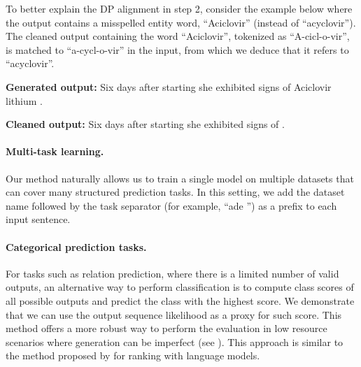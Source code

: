 To better explain the DP alignment in step 2, consider the example below where the output contains a misspelled entity word, ``Aciclovir'' (instead of ``acyclovir'').
The cleaned output containing the word ``Aciclovir'', tokenized as ``A-cicl-o-vir'', is matched to ``a-cycl-o-vir'' in the input, from which we deduce that it refers to ``acyclovir''.

\begin{footnotesize}
\begin{customquote}
\quotespacestart
    \textbf{Generated output:}
        Six days after starting \entitybegin {} \separator {} \entityend she exhibited signs of \entitybegin \entitybegin {} \separator {} \entityend {} \separator {} \separator {} \equals Aciclovir \separator {} \equals lithium \entityend .
        
    
    \textbf{Cleaned output:}
            Six days after starting  she exhibited signs of   .
\quotespaceend
\end{customquote}
\end{footnotesize}

\paragraph{Multi-task learning.} Our method naturally allows us to train a single model on multiple datasets that can cover many structured prediction tasks.
In this setting, we add the dataset name followed by the task separator \taskseparator (for example, ``ade \taskseparator '') as a prefix to each input sentence.

\paragraph{Categorical prediction tasks.}
For tasks such as relation prediction, where there is a limited number of valid outputs, an alternative way to perform classification is to compute class scores of all possible outputs and predict the class with the highest score.
We demonstrate that we can use the output sequence likelihood as a proxy for such score. 
This method offers a more robust way to perform the evaluation in low resource scenarios where generation can be imperfect (see ).
This approach is similar to the method proposed by \cite{dos_santos_2020_beyond} for ranking with language models.

